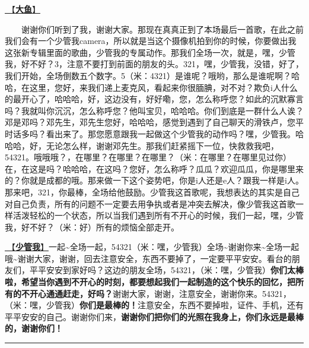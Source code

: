 \documentclass[]{ctexbook}
\begin{document}
\hyperref[big-fish]{🎵【\textbf{大鱼}】}

  谢谢你们听到了我，谢谢大家。那现在真真正到了本场最后一首歌，在此之前我们会有一个少管我camera，所以就是当这个摄像机拍到你的时候，你要做出我这张新专辑里面的歌曲，少管我的专属动作。那我们全场一次，就是，嘿，少管我，好不好？3，注意不要打到前面的朋友的头。321，嘿，少管我，没错，好了，我们开始，全场倒数五个数字。5（米：4321）是谁呢？哦哟，那么是谁呢啊？哈哈，在这里，您好，来我们递上麦克风，看起来你很腼腆，对不对？欺负i人什么的最开心了，哈哈哈，好，这边没有，好好嘞，您，怎么称呼您？如此的沉默寡言吗？我就叫你沉沉，怎么称呼您？他叫宝贝，哈哈哈。你们到底是一群什么人诶？邓是邓吗？邓先生，邓先生您好，哈哈哈，感觉到遇到了自己聊天的滑铁卢，您平时话多吗？看出来了。那您愿意跟我一起做这个少管我的动作吗？嘿，少管我。哈哈哈，好，无论怎么样，谢谢邓先生。那我们赶紧摇下一位，快救救我吧，54321。哦哦哦？，在哪里？在哪里？在哪里？（米：在哪里？在哪里见过你）在，在这是吗？哈哈哈，在这吗？您好，怎么称呼？瓜瓜？欢迎瓜瓜，你是哪里来的？你就是成都的哦。那来做一下这个姿势吧，你是i人还是e人？跟我一样是i人。那来吧，321，你最棒，全场给他鼓励。少管我这首歌呢，我想表达的其实是自己对自己负责，所有的问题不一定要去用争执或者是冲突去解决，像少管我这首歌一样活泼轻松的一个状态，所以当我们遇到所有不开心的时候，我们一起，嘿，少管我，好不好？（米：好）所有的烦恼全部走开。

\hyperref[watch-ur-manners]{🎵【\textbf{少管我}】}一起\textasciitilde 全场一起，54321（米：嘿，少管我）全场\textasciitilde 谢谢你来\textasciitilde 全场一起哦\textasciitilde 谢谢大家，谢谢，回去注意安全，东西不要掉了，一定要平平安安。看台的朋友们，平平安安到家好吗？这边的朋友全场，54321，（米：嘿，少管我）\textbf{你们太棒啦，希望当你遇到不开心的时刻，都要想起我们一起制造的这个快乐的回忆，把所有的不开心通通赶走，好吗？}谢谢大家，谢谢，注意安全，谢谢你来。54321，（米：嘿，少管我）\textbf{你们是最棒的！}注意安全，东西不要掉啦，证件、手机，还有平平安安的自己。谢谢你们来，\textbf{谢谢你们把你们的光照在我身上，你们永远是最棒的，谢谢你们！}

\begin{center}\rule{0.5\linewidth}{0.5pt}\end{center}
\end{document}
